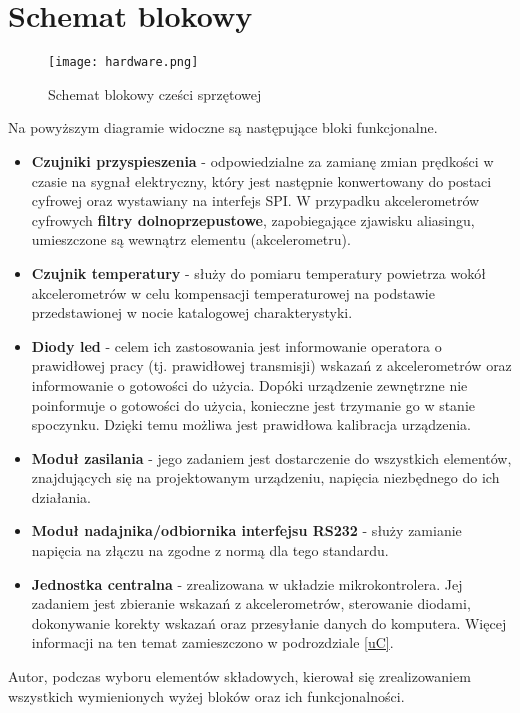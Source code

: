 	\section{Schemat blokowy} \label{schemat_blokowy}
		\begin{figure}[ht]
		\begin{center}
		\texttt{[image: hardware.png]}
		\caption{Schemat blokowy cześci sprzętowej}
		\end{center}
		\end{figure}
Na powyższym diagramie widoczne są następujące bloki funkcjonalne.
		\begin{itemize}
			\item \textbf{Czujniki przyspieszenia} - odpowiedzialne za zamianę zmian prędkości w czasie na sygnał elektryczny, który jest następnie konwertowany do postaci cyfrowej oraz wystawiany na interfejs SPI. W przypadku akcelerometrów cyfrowych \textbf{filtry dolnoprzepustowe}, zapobiegające zjawisku aliasingu, umieszczone są wewnątrz elementu (akcelerometru).
			\item \textbf{Czujnik temperatury} - służy do pomiaru temperatury powietrza wokół akcelerometrów w celu kompensacji temperaturowej na podstawie przedstawionej w nocie katalogowej charakterystyki.
			\item \textbf{Diody led} - celem ich zastosowania jest informowanie operatora o prawidłowej pracy (tj. prawidłowej transmisji) wskazań z akcelerometrów oraz informowanie o gotowości do użycia. Dopóki urządzenie zewnętrzne nie poinformuje o gotowości do użycia, konieczne jest trzymanie go w stanie spoczynku. Dzięki temu możliwa jest prawidłowa kalibracja urządzenia.
			\item \textbf{Moduł zasilania} - jego zadaniem jest dostarczenie do wszystkich elementów, znajdujących się na projektowanym urządzeniu, napięcia niezbędnego do ich działania.
			\item \textbf{Moduł nadajnika/odbiornika interfejsu RS232} - służy zamianie napięcia na złączu na zgodne z normą dla tego standardu.
			\item \textbf{Jednostka centralna} - zrealizowana w układzie mikrokontrolera. Jej zadaniem jest zbieranie wskazań z akcelerometrów, sterowanie diodami, dokonywanie korekty wskazań oraz przesyłanie danych do komputera. Więcej informacji na ten temat zamieszczono w podrozdziale \ref{uC}.
		\end{itemize}
Autor, podczas wyboru elementów składowych, kierował się zrealizowaniem wszystkich wymienionych wyżej bloków oraz ich funkcjonalności. 
\newpage

